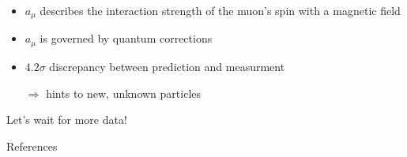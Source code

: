 \documentclass[12pt,notes]{beamer}
\begin{document}
\begin{frame}{\insertsection}
  \begin{itemize}
  \item $a_\mu$ describes the interaction strength of the muon's spin
    with a magnetic field
  \item $a_\mu$ is governed by quantum corrections
  \item $4.2\sigma$ discrepancy between prediction and measurment
  \item[$\Rightarrow$] hints to new, unknown particles
  \end{itemize}
  \begin{center}
    Let's wait for more data!
  \end{center}
\end{frame}


\begin{frame}[allowframebreaks]{References}
  \printbibliography
\end{frame}
\end{document}
